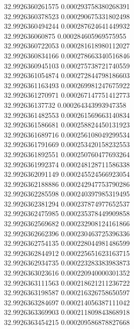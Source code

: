{32.9926360261575	0.000293758380268391\\
32.9926360378523	0.000290675331802498\\
32.9926360494244	0.000287624641449932\\
32.992636060875	0.000284605969575955\\
32.9926360722053	0.000281618980112027\\
32.9926360834166	0.000278663340516846\\
32.9926360945103	0.000275738721740559\\
32.9926361054874	0.000272844798186603\\
32.9926361163493	0.000269981247675922\\
32.9926361270971	0.000267147751412773\\
32.992636137732	0.000264343993947358\\
32.9926361482553	0.000261569663140834\\
32.9926361586681	0.000258824450131923\\
32.9926361689716	0.000256108049299534\\
32.9926361791669	0.000253420158232553\\
32.9926361892551	0.000250760477693264\\
32.9926361992374	0.000248128711586338\\
32.9926362091149	0.000245524566923054\\
32.9926362188886	0.000242947753790286\\
32.9926362285598	0.000240397985319495\\
32.9926362381294	0.000237874977652537\\
32.9926362475985	0.000235378449909858\\
32.9926362569682	0.000232908124161866\\
32.9926362662396	0.000230463725396336\\
32.9926362754135	0.000228044981486599\\
32.9926362844912	0.000225651623163715\\
32.9926362934735	0.000223283383983873\\
32.9926363023616	0.000220940000301352\\
32.9926363111563	0.000218621211236722\\
32.9926363198587	0.000216326758650597\\
32.9926363284697	0.000214056387111042\\
32.9926363369903	0.000211809843868918\\
32.9926363454215	0.000209586878827668\\
}
